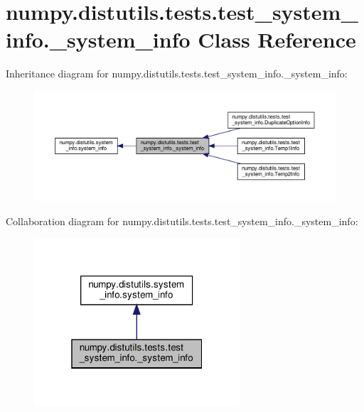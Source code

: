 \hypertarget{classnumpy_1_1distutils_1_1tests_1_1test__system__info_1_1__system__info}{}\section{numpy.\+distutils.\+tests.\+test\+\_\+system\+\_\+info.\+\_\+system\+\_\+info Class Reference}
\label{classnumpy_1_1distutils_1_1tests_1_1test__system__info_1_1__system__info}


Inheritance diagram for numpy.\+distutils.\+tests.\+test\+\_\+system\+\_\+info.\+\_\+system\+\_\+info\+:
\nopagebreak
\begin{figure}[H]
\begin{center}
\leavevmode
\includegraphics[width=350pt]{classnumpy_1_1distutils_1_1tests_1_1test__system__info_1_1__system__info__inherit__graph}
\end{center}
\end{figure}


Collaboration diagram for numpy.\+distutils.\+tests.\+test\+\_\+system\+\_\+info.\+\_\+system\+\_\+info\+:
\nopagebreak
\begin{figure}[H]
\begin{center}
\leavevmode
\includegraphics[width=217pt]{classnumpy_1_1distutils_1_1tests_1_1test__system__info_1_1__system__info__coll__graph}
\end{center}
\end{figure}

